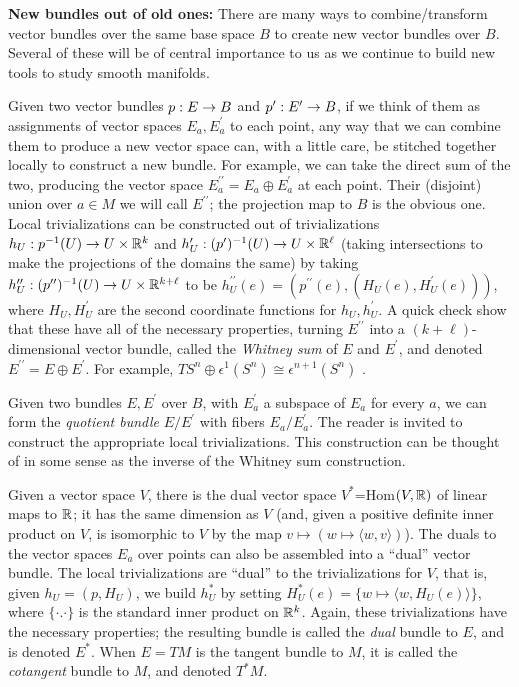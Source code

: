 \msk

{\bf New bundles out of old ones:} There are many ways to combine/transform 
vector bundles over the same base space $B$ to create new vector bundles over 
$B$. Several of these will be of central 
importance to us as we continue to build new tools to study smooth manifolds. 

\ssk

Given two vector bundles $p:E\rightarrow B$ and $p^\prime:E^\prime\rightarrow B$, if we think of them as
assignments of vector spaces $E_a,E_a^\prime$ to each point, any way that we can combine 
them to produce a new vector space can, with a little care, be stitched together locally
to construct a new bundle. For example, we can take the direct sum of the two, producing the
vector space $E_a^{\prime\prime}=E_a\oplus E_a^\prime$ at each point. Their (disjoint)
union over $a\in M$ we will call $E^{\prime\prime}$; the projection map to $B$ is
the obvious one. Local trivializations
can be constructed out of trivializations $h_U:p^{-1}(U)\rightarrow U\times {\Bbb R}^k$
and $h_U^\prime:(p^\prime)^{-1}(U)\rightarrow U\times {\Bbb R}^\ell$ (taking intersections to make the
projections of the domains the same) by taking 
$h_U^{\prime\prime}:(p^{\prime\prime})^{-1}(U)\rightarrow U\times {\Bbb R}^{k+\ell}$ to be 
$h_U^{\prime\prime}(e)=(p^{\prime\prime}(e),(H_U(e),H_U^\prime(e)))$, where
$H_U,H_U^\prime$ are the second coordinate functions for $h_U,h_U^\prime$. A quick check
show that these have all of the necessary properties, turning $E^{\prime\prime}$ into
a $(k+\ell)$-dimensional vector bundle, called the {\it Whitney sum} of $E$ and $E^\prime$,
and denoted $E^{\prime\prime}=E\oplus E^\prime$. For example, 
$TS^n\oplus \epsilon^1(S^n)\cong \epsilon^{n+1}(S^n)$ .

\ssk

Given two bundles $E,E^\prime$ over $B$, with $E^\prime_a$ a subspace of $E_a$ for every $a$,
we can form the {\it quotient bundle} $E/E^\prime$ with fibers $E_a/E^\prime_a$. The reader is 
invited to construct the appropriate local trivializations. This construction can be thought 
of in some sense as the inverse of the Whitney sum construction.

\ssk

Given a vector space $V$, there is the dual vector space $V^*$=Hom$(V,{\Bbb R})$ of linear maps
to ${\Bbb R}$; it has the same dimension as $V$ (and, given a positive definite inner product
on $V$, is isomorphic to $V$ by the map $v\mapsto (w\mapsto \langle w,v\rangle)$). The duals
to the vector spaces $E_a$ over points can 
also be assembled into a ``dual'' vector bundle. The local trivializations are ``dual'' to the 
trivializations for $V$, that is, given $h_U=(p,H_U)$, we build $h_U^*$ by setting 
$H_U^*(e)=\{w\mapsto \langle w,H_U(e)\rangle\}$, where $\lbrace\cdot.\cdot\rbrace$ is the standard
inner product on ${\Bbb R}^k$. Again, these trivializations have the necessary properties; the resulting
bundle is called the {\it dual} bundle to $E$, and is denoted $E^*$. When $E=TM$ is the tangent
bundle to $M$, it is called the {\it cotangent} bundle to $M$, and denoted $T^*M$.


